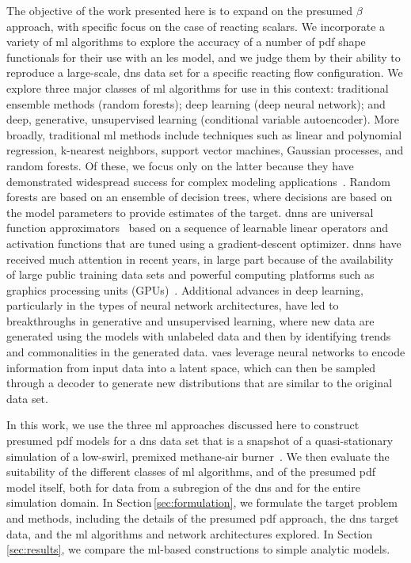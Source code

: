 \documentclass[review]{elsarticle}
\begin{document}
The objective of the work presented here is to expand on the presumed
$\beta$ approach, with specific focus on the case of
reacting scalars. We incorporate a variety of \gls{ml} algorithms to
explore the accuracy of a number of \gls{pdf} shape functionals for
their use with an \gls{les} model, and we judge them by their ability to
reproduce a large-scale, \gls{dns} data set for a specific reacting flow
configuration. We explore three major classes of \gls{ml} algorithms
for use in this context: traditional ensemble methods (random
forests); deep learning (deep neural network); and deep, generative,
unsupervised learning (conditional variable autoencoder). More
broadly, traditional \gls{ml} methods include techniques such as
linear and polynomial regression, k-nearest neighbors, support vector
machines, Gaussian processes, and random forests. Of these, we focus
only on the latter because they have demonstrated widespread success for
complex modeling
applications~\cite{Fernandez-Delgado2014,Liaw2002}. Random forests are
based on an ensemble of decision trees, where decisions are based on
the model parameters to provide estimates of the
target. \Glspl{dnn} are universal function
approximators~\cite{Cybenko1989,Hornik1991} based on a sequence of
learnable linear operators and activation functions that are tuned
using a gradient-descent optimizer. \Glspl{dnn} have received much
attention in recent years, in large part because of the availability of large
public training data sets and powerful computing platforms such as
graphics processing units (GPUs)~\cite{Goodfellow2016}. Additional
advances in deep learning, particularly in the types of neural
network architectures, have led to breakthroughs in generative and
unsupervised learning, where new data are generated using the models
with unlabeled data and then by identifying trends and commonalities in
the generated data. \Glspl{vae} leverage neural networks to encode
information from input data into a latent space, which can then be
sampled through a decoder to generate new distributions that are
similar to the original data set.

In this work, we use the three \gls{ml} approaches discussed here
to construct presumed \gls{pdf} models for a \gls{dns} data set
that is a snapshot of a quasi-stationary simulation of a low-swirl,
premixed methane-air burner~\cite{Day2012}. We then evaluate the
suitability of the different classes of \gls{ml} algorithms, and of
the presumed \gls{pdf} model itself, both for data from a subregion of
the \gls{dns} and for the entire simulation
domain. In Section\,\ref{sec:formulation}, we formulate the target
problem and methods, including the details of the presumed \gls{pdf}
approach, the \gls{dns} target data, and the \gls{ml} algorithms and
network architectures explored. In Section\,\ref{sec:results}, we
compare the \gls{ml}-based constructions to simple analytic models.
\end{document}

